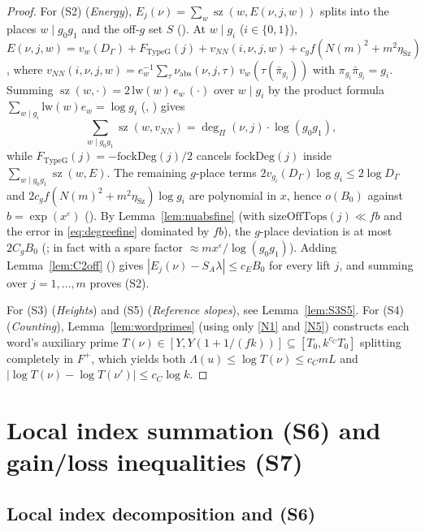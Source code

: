 \documentclass[11pt]{amsart}
\newcommand{\eps}{\varepsilon}
\DeclareMathOperator{\sz}{sz}
\theoremstyle{plain}
\theoremstyle{definition}
\numberwithin{equation}{section}
\begin{document}
\begin{proof}
For \textup{(S2)} (\emph{Energy}), $E_j(\nu)=\sum_w\sz(w,E(\nu,j,w))$ splits into the places
$w\mid g_0 g_1$ and the off-$g$ set $S$ ().
At $w\mid g_i$ ($i\in\{0,1\}$), $E(\nu,j,w)=v_w(D_\Gamma)+F_{\mathrm{TypeG}}(j)+v_{NN}(i,\nu,j,w)
+c_g f(N(m)^2+m^2\eta_{\mathrm{Sz}})$, where
$v_{NN}(i,\nu,j,w)=e_w^{-1}\sum_\tau\nu_{\mathrm{abs}}(\nu,j,\tau)\,v_w(\tau(\bar\pi_{g_i}))$ with
$\pi_{g_i}\bar\pi_{g_i}=g_i$. Summing $\sz(w,\cdot)=2\,\mathrm{lw}(w)\,e_w\,(\cdot)$ over
$w\mid g_i$ by the product formula $\sum_{w\mid g_i}\mathrm{lw}(w)e_w=\log g_i$
(, ) gives
\[
\sum_{w\mid g_0 g_1}\sz(w,v_{NN})=\deg_\Pi(\nu,j)\cdot\log(g_0 g_1),
\]
while $F_{\mathrm{TypeG}}(j)=-\mathrm{fockDeg}(j)/2$ cancels $\mathrm{fockDeg}(j)$ inside
$\sum_{w\mid g_0g_1}\sz(w,E)$. The remaining $g$-place terms $2v_{g_i}(D_\Gamma)\log g_i\le
2\log D_\Gamma$ and $2c_g f(N(m)^2+m^2\eta_{\mathrm{Sz}})\log g_i$ are polynomial in $x$, hence
$o(B_0)$ against $b=\exp(x^\eps)$ (). By Lemma~\ref{lem:nuabsfine} (with
$\mathrm{sizeOffTops}(j)\ll fb$ and the error in \eqref{eq:degreefine} dominated by $fb$), the
$g$-place deviation is at most $2C_g B_0$ (; in fact with a spare factor
$\approx m x^\eps/\log(g_0g_1)$). Adding Lemma~\ref{lem:C2off} ()
gives $|E_j(\nu)-S_A\lambda|\le c_E B_0$ for every lift $j$, and summing over $j=1,\dots,m$ proves
\textup{(S2)}.

For \textup{(S3)} (\emph{Heights}) and \textup{(S5)} (\emph{Reference slopes}), see
Lemma~\ref{lem:S3S5}. For \textup{(S4)} (\emph{Counting}), Lemma~\ref{lem:wordprimes} (using only
\ref{N1} and \ref{N5}) constructs each word's auxiliary prime
$T(\nu)\in[Y,Y(1+1/(fk))]\subseteq[T_0, k^{c_C} T_0]$ splitting completely in $F^+$, which yields
both $\Lambda(u)\le\log T(\nu)\le c_C mL$ and $|\log T(\nu)-\log T(\nu')|\le c_C\log k$.
\end{proof}

\section{Local index summation (S6) and gain/loss inequalities (S7)}\label{sec:S6S7}

\subsection{Local index decomposition and (S6)}
\end{document}

